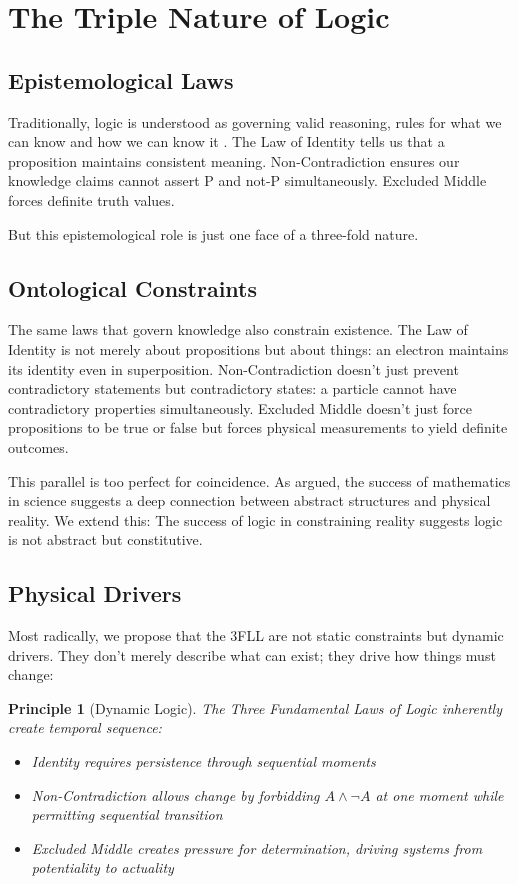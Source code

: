 \documentclass[12pt,a4paper]{article}
\newtheorem{principle}{Principle}
\begin{document}
\section{The Triple Nature of Logic}

\subsection{Epistemological Laws}

Traditionally, logic is understood as governing valid reasoning, rules for what we can know and how we can know it \citep{frege1884foundations, russell1903principles}. The Law of Identity tells us that a proposition maintains consistent meaning. Non-Contradiction ensures our knowledge claims cannot assert P and not-P simultaneously. Excluded Middle forces definite truth values.

But this epistemological role is just one face of a three-fold nature.

\subsection{Ontological Constraints}

The same laws that govern knowledge also constrain existence. The Law of Identity is not merely about propositions but about things: an electron maintains its identity even in superposition. Non-Contradiction doesn't just prevent contradictory statements but contradictory states: a particle cannot have contradictory properties simultaneously. Excluded Middle doesn't just force propositions to be true or false but forces physical measurements to yield definite outcomes.

This parallel is too perfect for coincidence. As \citet{putnam1975mathematics} argued, the success of mathematics in science suggests a deep connection between abstract structures and physical reality. We extend this: The success of logic in constraining reality suggests logic is not abstract but constitutive.

\subsection{Physical Drivers}

Most radically, we propose that the 3FLL are not static constraints but dynamic drivers. They don't merely describe what can exist; they drive how things must change:

\begin{principle}[Dynamic Logic]
The Three Fundamental Laws of Logic inherently create temporal sequence:
\begin{itemize}
\item Identity requires persistence through sequential moments
\item Non-Contradiction allows change by forbidding $A \land \neg A$ at one moment while permitting sequential transition
\item Excluded Middle creates pressure for determination, driving systems from potentiality to actuality
\end{itemize}
\end{principle}
\end{document}
